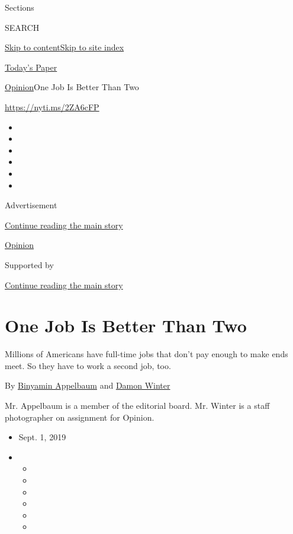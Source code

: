 Sections

SEARCH

\protect\hyperlink{site-content}{Skip to
content}\protect\hyperlink{site-index}{Skip to site index}

\href{https://myaccount.nytimes3xbfgragh.onion/auth/login?response_type=cookie\&client_id=vi}{}

\href{https://www.nytimes3xbfgragh.onion/section/todayspaper}{Today's
Paper}

\href{/section/opinion}{Opinion}\textbar{}One Job Is Better Than Two

\url{https://nyti.ms/2ZA6cFP}

\begin{itemize}
\item
\item
\item
\item
\item
\item
\end{itemize}

Advertisement

\protect\hyperlink{after-top}{Continue reading the main story}

\href{/section/opinion}{Opinion}

Supported by

\protect\hyperlink{after-sponsor}{Continue reading the main story}

\hypertarget{one-job-is-better-than-two}{%
\section{One Job Is Better Than Two}\label{one-job-is-better-than-two}}

Millions of Americans have full-time jobs that don't pay enough to make
ends meet. So they have to work a second job, too.

By
\href{https://www.nytimes3xbfgragh.onion/by/binyamin-appelbaum}{Binyamin
Appelbaum} and
\href{https://www.nytimes3xbfgragh.onion/by/damon-winter}{Damon Winter}

Mr. Appelbaum is a member of the editorial board. Mr. Winter is a staff
photographer on assignment for Opinion.

\begin{itemize}
\item
  Sept. 1, 2019
\item
  \begin{itemize}
  \item
  \item
  \item
  \item
  \item
  \item
  \end{itemize}
\end{itemize}


